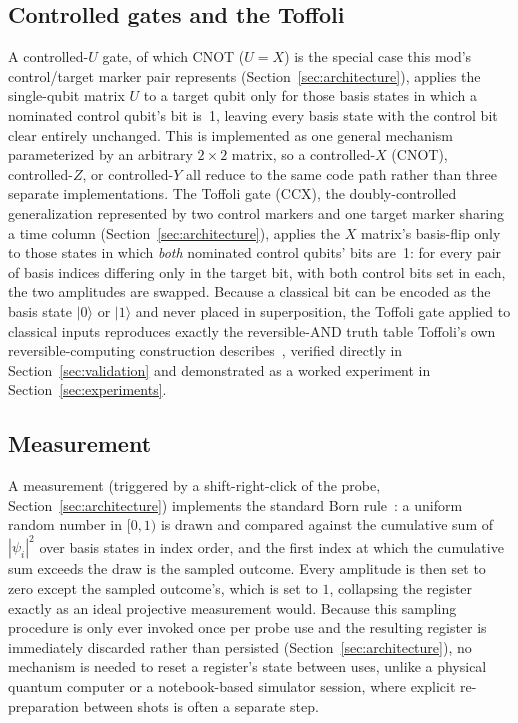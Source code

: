 \subsection{Controlled gates and the Toffoli}

A controlled-$U$ gate, of which CNOT ($U = X$) is the special case this mod's control/target
marker pair represents (Section~\ref{sec:architecture}), applies the single-qubit matrix $U$
to a target qubit only for those basis states in which a nominated control qubit's bit is~1,
leaving every basis state with the control bit clear entirely unchanged. This is implemented
as one general mechanism parameterized by an arbitrary $2\times2$ matrix, so a controlled-$X$
(CNOT), controlled-$Z$, or controlled-$Y$ all reduce to the same code path rather than three
separate implementations. The Toffoli gate (CCX), the doubly-controlled generalization
represented by two control markers and one target marker sharing a time column
(Section~\ref{sec:architecture}), applies the $X$ matrix's basis-flip only to those states in
which \emph{both} nominated control qubits' bits are~1: for every pair of basis indices
differing only in the target bit, with both control bits set in each, the two amplitudes are
swapped. Because a classical bit can be encoded as the basis state $|0\rangle$ or
$|1\rangle$ and never placed in superposition, the Toffoli gate applied to classical inputs
reproduces exactly the reversible-AND truth table Toffoli's own reversible-computing
construction describes~\cite{toffoli1980reversible}, verified directly in
Section~\ref{sec:validation} and demonstrated as a worked experiment in
Section~\ref{sec:experiments}.

\subsection{Measurement}

A measurement (triggered by a shift-right-click of the probe, Section~\ref{sec:architecture})
implements the standard Born rule~\cite{nielsenchuang2010}: a uniform random number in
$[0,1)$ is drawn and compared against the cumulative sum of $|\psi_i|^2$ over basis states in
index order, and the first index at which the cumulative sum exceeds the draw is the sampled
outcome. Every amplitude is then set to zero except the sampled outcome's, which is set to
$1$, collapsing the register exactly as an ideal projective measurement would. Because this
sampling procedure is only ever invoked once per probe use and the resulting register is
immediately discarded rather than persisted (Section~\ref{sec:architecture}), no mechanism is
needed to reset a register's state between uses, unlike a physical quantum computer or a
notebook-based simulator session, where explicit re-preparation between shots is often a
separate step.

